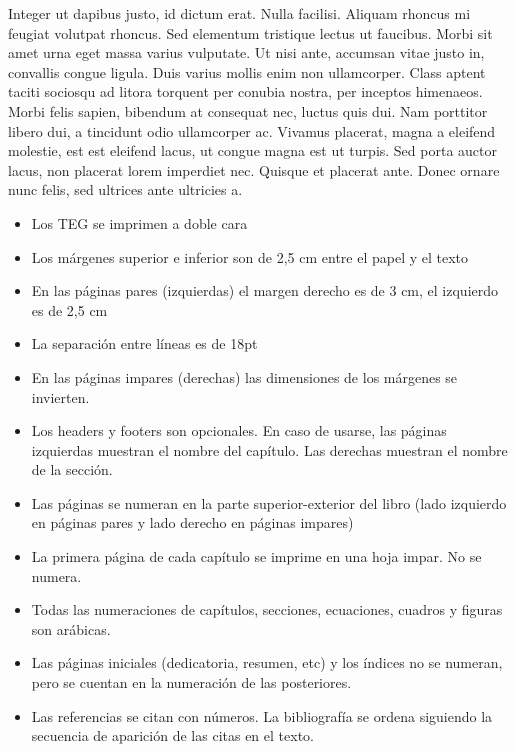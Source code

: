 Integer ut dapibus justo, id dictum erat. Nulla facilisi. Aliquam rhoncus mi feugiat volutpat rhoncus. Sed elementum tristique lectus ut faucibus. Morbi sit amet urna eget massa varius vulputate. Ut nisi ante, accumsan vitae justo in, convallis congue ligula. Duis varius mollis enim non ullamcorper. Class aptent taciti sociosqu ad litora torquent per conubia nostra, per inceptos himenaeos. Morbi felis sapien, bibendum at consequat nec, luctus quis dui. Nam porttitor libero dui, a tincidunt odio ullamcorper ac. Vivamus placerat, magna a eleifend molestie, est est eleifend lacus, ut congue magna est ut turpis. Sed porta auctor lacus, non placerat lorem imperdiet nec. Quisque et placerat ante. Donec ornare nunc felis, sed ultrices ante ultricies a. 

\begin{itemize}
\item Los TEG se imprimen a doble cara 
\item Los márgenes superior e inferior son de 2,5 cm entre el papel y el texto 
\item En las páginas pares (izquierdas) el margen derecho es de 3 cm, el izquierdo es de 2,5 cm
\item La separaci\'on entre l\'ineas es de 18pt 
\item En las páginas impares (derechas) las dimensiones de los márgenes se invierten.
\item Los headers y footers son opcionales. En caso de usarse, las páginas izquierdas muestran el nombre del capítulo. Las derechas muestran el nombre de la sección.
\item Las páginas se numeran en la parte superior-exterior del libro (lado izquierdo en páginas pares y lado derecho en páginas impares)
\item La primera página de cada capítulo se imprime en una hoja impar. No se numera.
\item Todas las numeraciones de capítulos, secciones, ecuaciones, cuadros y figuras son arábicas. 
\item Las páginas iniciales (dedicatoria, resumen, etc) y los índices no se numeran, pero se cuentan en la numeración de las posteriores.
\item Las referencias se citan con números. La bibliografía se ordena siguiendo la secuencia de aparición de las citas en el texto.
\end{itemize}
